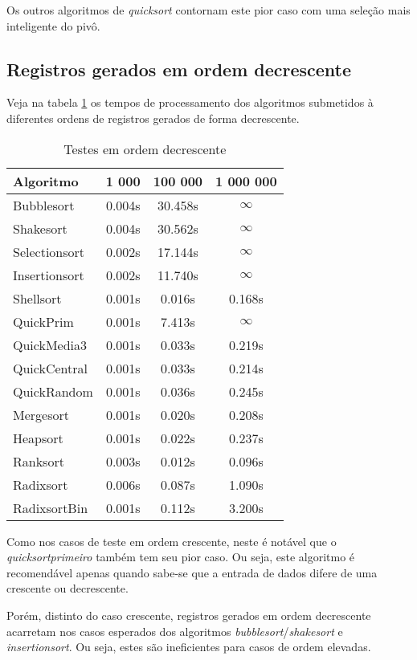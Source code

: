 \documentclass[
	11pt,
	oneside,
	a4paper,
	english,
	brazil,
	]{article}
\begin{document}
Os outros algoritmos de \textit{quicksort} contornam este pior caso com uma
seleção mais inteligente do pivô.

\subsection{Registros gerados em ordem decrescente}
Veja na tabela \ref{tab:d} os tempos de processamento dos algoritmos submetidos
à diferentes ordens de registros gerados de forma decrescente.

\begin{table}[ht]
\centering
\begin{tabular}{lccc}
\hline 
\textbf{Algoritmo} & \textbf{1 000} & \textbf{100 000} &  \textbf{1 000 000}  \\
\hline
Bubblesort   	& 0.004s & 30.458s  & $\infty$   \\
Shakesort  		& 0.004s & 30.562s  & $\infty$   \\
Selectionsort	& 0.002s & 17.144s  & $\infty$   \\
Insertionsort  	& 0.002s & 11.740s  & $\infty$   \\
Shellsort 		& 0.001s & 0.016s   & 0.168s     \\
QuickPrim		& 0.001s & 7.413s   & $\infty$   \\
QuickMedia3		& 0.001s & 0.033s   & 0.219s     \\
QuickCentral	& 0.001s & 0.033s   & 0.214s     \\
QuickRandom		& 0.001s & 0.036s   & 0.245s     \\
Mergesort 		& 0.001s & 0.020s   & 0.208s     \\
Heapsort 		& 0.001s & 0.022s   & 0.237s     \\
Ranksort 		& 0.003s & 0.012s   & 0.096s     \\
Radixsort 		& 0.006s & 0.087s   & 1.090s     \\
RadixsortBin 	& 0.001s & 0.112s   & 3.200s     \\
\hline
\end{tabular}
\caption{Testes em ordem decrescente}
\label{tab:d}
\end{table}

Como nos casos de teste em ordem crescente, neste é notável que o
\textit{quicksortprimeiro} também tem seu pior caso. Ou seja, este algoritmo é 
recomendável apenas quando sabe-se que a entrada de dados difere de uma
crescente ou decrescente.

Porém, distinto do caso crescente, registros gerados em ordem decrescente
acarretam nos casos esperados dos algoritmos \textit{bubblesort}/\textit{shakesort}
e \textit{insertionsort}. Ou seja, estes são ineficientes para casos de ordem
elevadas.
\end{document}
